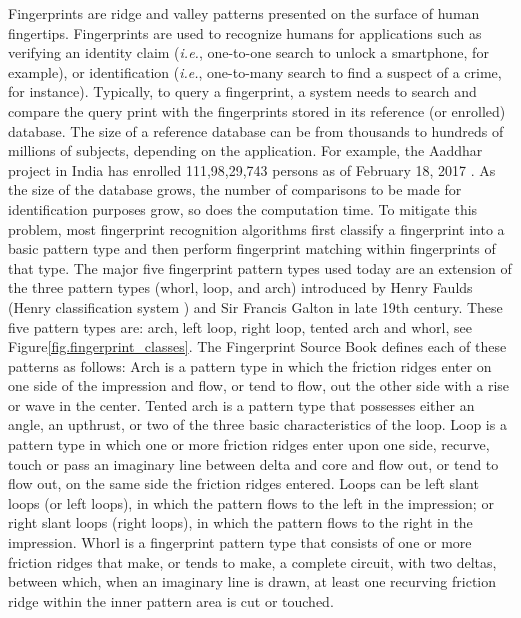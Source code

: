 

Fingerprints are ridge and valley patterns presented on the surface of human fingertips.
%
Fingerprints are used to recognize humans for applications such as verifying an identity claim (\textit{i.e.}, one-to-one search to  unlock a smartphone, for example), or identification (\textit{i.e.}, one-to-many search to find a suspect of a crime, for instance).
%
Typically, to query a fingerprint, a system needs to search and compare the query print with the fingerprints stored in its reference (or enrolled) database.  The size of a reference database can be from thousands to hundreds of millions of subjects, depending on the application. For example, the Aaddhar project in India has enrolled 111,98,29,743 persons as of February 18, 2017 \cite{aaddhaar}.  
%
As the size of the database grows, the number of comparisons to be made for identification purposes grow, so does the computation time.
%
To mitigate this problem, most fingerprint recognition algorithms first classify a fingerprint into a basic pattern type and then perform fingerprint matching within fingerprints of that type.
%
The major five fingerprint pattern types used today are an extension of the three pattern types (whorl, loop, and arch) introduced by Henry Faulds (Henry classification system \cite{henry1905classification}) and Sir Francis Galton \cite{galton1892} in late 19th century. These five pattern types are: arch, left loop, right loop, tented arch and whorl, see Figure\ref{fig.fingerprint_classes}.  
%
The Fingerprint Source Book \cite{nijSourceBook} defines each of these patterns as follows: 
%
Arch is a pattern type in which the friction ridges enter on one side of the impression and flow, or tend to flow, out the other side with a rise or wave in the center. 
%
Tented arch is a pattern type that possesses either an angle, an upthrust, or two of the three basic characteristics of the loop. 
%
Loop is a pattern type in which one or more friction ridges enter upon one side, recurve, touch or pass an imaginary line between delta and core and flow out, or tend to flow out, on the same side the friction ridges entered. Loops can be left slant loops (or left loops), in which the pattern flows to the left in the impression; or right slant loops (right loops), in which the pattern flows to the right in the impression.
%
Whorl is a fingerprint pattern type that consists of one or more friction ridges that make, or tends to make, a complete circuit, with two deltas, between which, when an imaginary line is drawn, at least one recurving friction ridge within the inner pattern area is cut or touched. 

